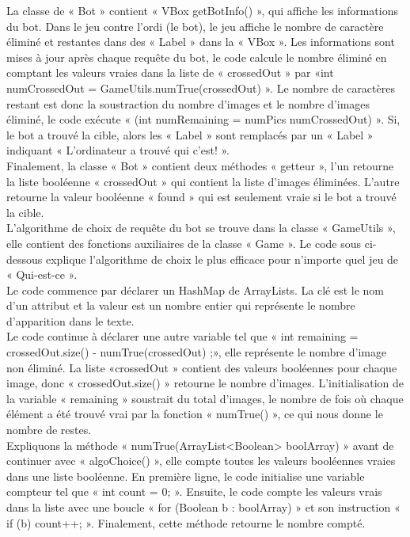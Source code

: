 \documentclass[a4paper]{article}
\begin{document}
La classe de « Bot » contient « VBox getBotInfo() », qui affiche les informations du bot. Dans le jeu contre l'ordi (le bot), le jeu affiche le nombre de caractère éliminé et restantes dans des « Label » dans la « VBox ». Les informations sont mises à jour après chaque requête du bot, le code calcule le nombre éliminé en comptant les valeurs vraies dans la liste de « crossedOut » par «int numCrossedOut = GameUtils.numTrue(crossedOut) ». Le nombre de caractères restant est donc la soustraction du nombre d’images et le nombre d’images éliminé, le code exécute « (int numRemaining = numPics \- numCrossedOut) ». Si, le bot a trouvé la cible, alors les « Label » sont remplacés par un « Label » indiquant « L'ordinateur a trouvé qui c'est! ».\\

Finalement, la classe « Bot » contient deux méthodes « getteur », l’un retourne la liste booléenne « crossedOut » qui contient la liste d’images éliminées. L’autre retourne la valeur booléenne « found » qui est seulement vraie si le bot a trouvé la cible.\\
 
L’algorithme de choix de requête du bot se trouve dans la classe « GameUtils », elle contient des fonctions auxiliaires de la classe « Game ». Le code sous ci-dessous explique l’algorithme de choix le plus efficace pour n’importe quel jeu de « Qui-est-ce ».\\
Le code commence par déclarer un HashMap de ArrayLists. La clé est le nom d'un attribut et la valeur est un nombre entier qui représente le nombre d’apparition dans le texte.\\
Le code continue à déclarer une autre variable tel que « int remaining = crossedOut.size() - numTrue(crossedOut) ;», elle représente le nombre d’image non éliminé. La liste «crossedOut » contient des valeurs booléennes pour chaque image, donc « crossedOut.size() » retourne le nombre d'images. L’initialisation de la variable « remaining » soustrait du total d’images, le nombre de fois où chaque élément a été trouvé vrai par la fonction « numTrue() », ce qui nous donne le nombre de restes.\\

Expliquons la méthode « numTrue(ArrayList<Boolean> boolArray) » avant de continuer avec « algoChoice() », elle compte toutes les valeurs booléennes vraies dans une liste booléenne. En première ligne, le code initialise une variable compteur tel que « int count = 0; ». Ensuite, le code compte les valeurs vrais dans la liste avec une boucle « for (Boolean b : boolArray) » et son instruction « if (b) {count++;} ». Finalement, cette méthode retourne le nombre compté.\\
\end{document}
